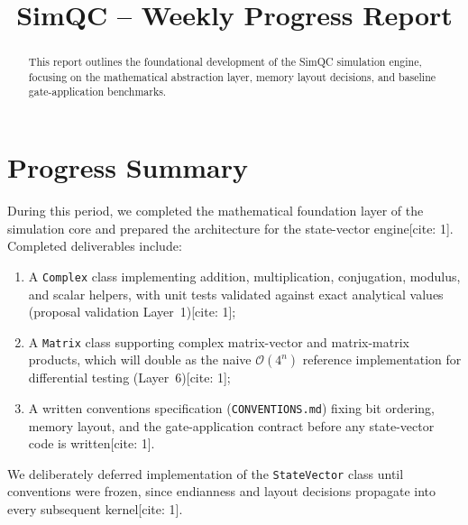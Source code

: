 \documentclass[conference]{IEEEtran}
\begin{document}
\title{SimQC -- Weekly Progress Report\\}
\author{
}

\maketitle

\begin{abstract}
This report outlines the foundational development of the SimQC simulation engine, focusing on the mathematical abstraction layer, memory layout decisions, and baseline gate-application benchmarks.
\end{abstract}

\section{Progress Summary}
During this period, we completed the mathematical foundation layer of the simulation core and prepared the architecture for the state-vector engine[cite: 1]. Completed deliverables include:
\begin{enumerate}
    \item A \texttt{Complex} class implementing addition, multiplication, conjugation, modulus, and scalar helpers, with unit tests validated against exact analytical values (proposal validation Layer~1)[cite: 1];
    \item A \texttt{Matrix} class supporting complex matrix-vector and matrix-matrix products, which will double as the naive $\mathcal{O}(4^n)$ reference implementation for differential testing (Layer~6)[cite: 1];
    \item A written conventions specification (\texttt{CONVENTIONS.md}) fixing bit ordering, memory layout, and the gate-application contract before any state-vector code is written[cite: 1].
\end{enumerate}
We deliberately deferred implementation of the \texttt{StateVector} class until conventions were frozen, since endianness and layout decisions propagate into every subsequent kernel[cite: 1].
\end{document}
